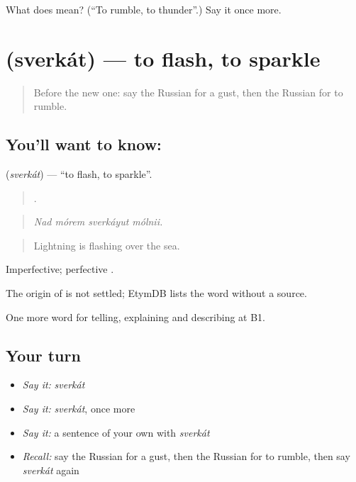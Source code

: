 \begin{tcolorbox}[breakable,colback=teal!4,colframe=teal!35!black,title={Before you move on}]
What does  mean? (\textquotedblleft{}To rumble, to thunder\textquotedblright{}.) Say it once more.
\end{tcolorbox}
\section[\texorpdfstring{\ru{сверкать} (sverkát)}{сверкать (sverkát)}]{ (sverkát) — to flash, to sparkle}

\label{lesson:RU-C466-sverkat}



\begin{quote}
Before the new one: say the Russian for a gust, then the Russian for to rumble.
\end{quote}

\subsection*{You'll want to know: }
\textbf{} (\emph{sverkát}) — \textquotedblleft{}to flash, to sparkle\textquotedblright{}.

\begin{quote}
   .
\end{quote}

\begin{quote}
\emph{Nad mórem sverkáyut mólnii.}
\end{quote}

\begin{quote}
Lightning is flashing over the sea.
\end{quote}

Imperfective; perfective \emph{}.

\begin{cousinweb}
The origin of \emph{} is not settled; EtymDB lists the word without a source.
\end{cousinweb}

\begin{grammarlens}[title={What you've built}]
One more word for telling, explaining and describing at B1.
\end{grammarlens}

\subsection*{Your turn}
\begin{itemize}
\raggedright
  \item \emph{Say it:} \emph{sverkát}
  \item \emph{Say it:} \emph{sverkát}, once more
  \item \emph{Say it:} a sentence of your own with \emph{sverkát}
  \item \emph{Recall:} say the Russian for a gust, then the Russian for to rumble, then say \emph{sverkát} again
\end{itemize}

